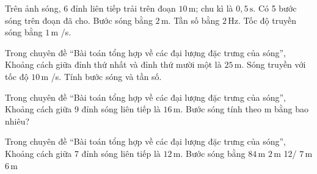 \begin{ex}
Trên ảnh sóng, 6 đỉnh liên tiếp trải trên đoạn $10\,\text{m}$; chu kì là $0,5\,\text{s}$.
\choiceTF
{\True Có 5 bước sóng trên đoạn đã cho.}
{\True Bước sóng bằng $2\,\text{m}$.}
{\True Tần số bằng $2\,\text{Hz}$.}
{Tốc độ truyền sóng bằng $1\,\text{m}$ /s.}
\end{ex}

\begin{ex}
Trong chuyên đề “Bài toán tổng hợp về các đại lượng đặc trưng của sóng”, Khoảng cách giữa đỉnh thứ nhất và đỉnh thứ mười một là $25\,\text{m}$. Sóng truyền với tốc độ $10\,\text{m}$ /s. Tính bước sóng và tần số.
\choiceTF

\end{ex}

\begin{ex}
Trong chuyên đề “Bài toán tổng hợp về các đại lượng đặc trưng của sóng”, Khoảng cách giữa 9 đỉnh sóng liên tiếp là $16\,\text{m}$. Bước sóng tính theo m bằng bao nhiêu?
\end{ex}

\begin{ex}
Trong chuyên đề “Bài toán tổng hợp về các đại lượng đặc trưng của sóng”, Khoảng cách giữa 7 đỉnh sóng liên tiếp là $12\,\text{m}$. Bước sóng bằng
\choice
{$84\,\text{m}$}
{\True $2\,\text{m}$}
{12/ $7\,\text{m}$}
{$6\,\text{m}$}
\end{ex}

